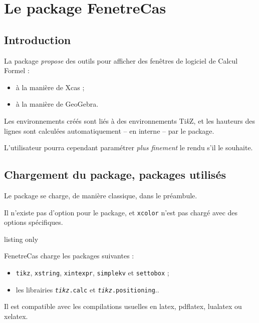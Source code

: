 \documentclass[french,a4paper,11pt]{article}
\providecommand\tikzlogo{Ti\textit{k}Z}
\let\TikZ\tikzlogo
\begin{document}
\section{Le package FenetreCas}

\subsection{Introduction}

\begin{noteblock}
La package \textit{propose} des outils pour afficher des fenêtres de logiciel de Calcul Formel :

\begin{itemize}
	\item à la manière de \textsf{Xcas} ;
	\item à la manière de \textsf{GeoGebra}.
\end{itemize}
\vspace*{-\baselineskip}\leavevmode
\end{noteblock}

\begin{importantblock}
Les environnements créés sont liés à des environnements \TikZ, et les hauteurs des lignes sont calculées automatiquement -- en interne -- par le package.

\smallskip

L'utilisateur pourra cependant paramétrer \textit{plus finement} le rendu s'il le souhaite.
\end{importantblock}

\subsection{Chargement du package, packages utilisés}

\begin{importantblock}
Le package se charge, de manière classique, dans le préambule.

Il n'existe pas d'option pour le package, et \texttt{xcolor} n'est pas chargé avec des options spécifiques.
\end{importantblock}

\begin{PresentationCode}{listing only}
\usepackage{FenetreCas}
\end{PresentationCode}

\begin{noteblock}
\textsf{FenetreCas} charge les packages suivantes :

\begin{itemize}
	\item \texttt{tikz}, \texttt{xstring}, \texttt{xintexpr}, \texttt{simplekv} et \texttt{settobox} ;
	\item les librairies \texttt{\textit{tikz}.calc} et \texttt{\textit{tikz}.positioning}..
\end{itemize}

Il est compatible avec les compilations usuelles en \textsf{latex}, \textsf{pdflatex}, \textsf{lualatex} ou \textsf{xelatex}.
\end{noteblock}
\end{document}
